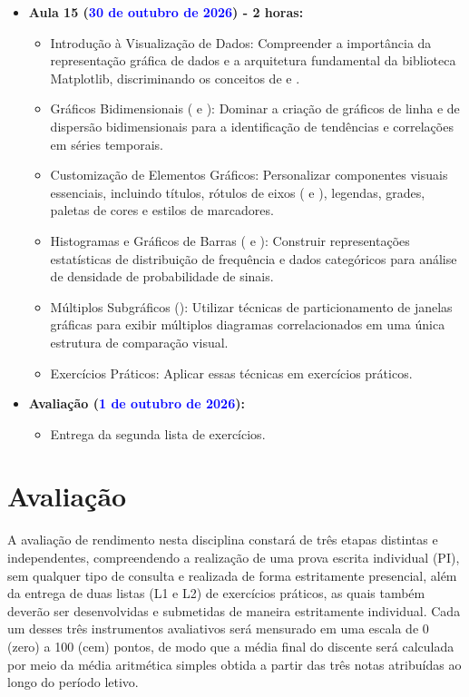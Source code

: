 \begin{itemize}
    \item \textbf{Aula 15 (\textcolor{blue}{30 de outubro de 2026}) - 2 horas:}
    \begin{itemize}\justifying
        \item Introdução à Visualização de Dados: Compreender a importância da representação gráfica de dados e a arquitetura fundamental da biblioteca Matplotlib, discriminando os conceitos de  e .
        \item Gráficos Bidimensionais ( e ): Dominar a criação de gráficos de linha e de dispersão bidimensionais para a identificação de tendências e correlações em séries temporais.
        \item Customização de Elementos Gráficos: Personalizar componentes visuais essenciais, incluindo títulos, rótulos de eixos ( e ), legendas, grades, paletas de cores e estilos de marcadores.
        \item Histogramas e Gráficos de Barras ( e ): Construir representações estatísticas de distribuição de frequência e dados categóricos para análise de densidade de probabilidade de sinais.
        \item Múltiplos Subgráficos (): Utilizar técnicas de particionamento de janelas gráficas para exibir múltiplos diagramas correlacionados em uma única estrutura de comparação visual.
        \item Exercícios Práticos: Aplicar essas técnicas em exercícios práticos.

    \end{itemize}


    \item \textbf{Avaliação (\textcolor{blue}{1 de outubro de 2026}):}
    \begin{itemize}\justifying
        \item Entrega da segunda lista de exercícios.
    \end{itemize}

\end{itemize}



\section*{Avaliação}

A avaliação de rendimento nesta disciplina constará de três etapas distintas e independentes, compreendendo a realização de uma prova escrita individual (PI), sem qualquer tipo de consulta e realizada de forma estritamente presencial, além da entrega de duas listas (L1 e L2) de exercícios práticos, as quais também deverão ser desenvolvidas e submetidas de maneira estritamente individual. Cada um desses três instrumentos avaliativos será mensurado em uma escala de 0 (zero) a 100 (cem) pontos, de modo que a média final do discente será calculada por meio da média aritmética simples obtida a partir das três notas atribuídas ao longo do período letivo.

